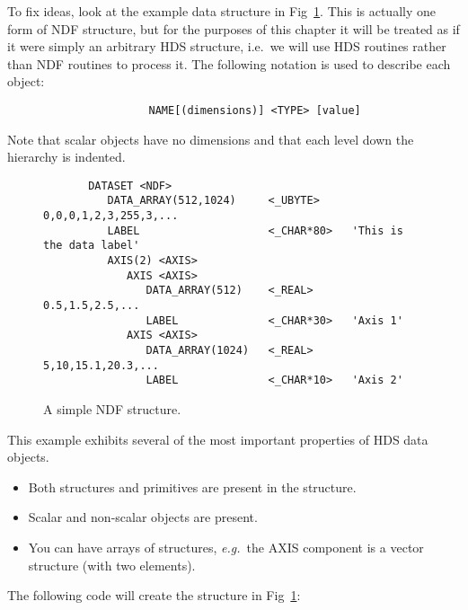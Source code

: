 To fix ideas, look at the example data structure in Fig~\ref{F_exndf}.
This is actually one form of NDF structure, but for the purposes of this chapter
it will be treated as if it were simply an arbitrary HDS structure, i.e.\ we
will use HDS routines rather than NDF routines to process it.
The following notation is used to describe each object:

\begin{small}
\begin{verbatim}
                      NAME[(dimensions)] <TYPE> [value]
\end{verbatim}
\end{small}


Note that scalar objects have no dimensions and that each level down the
hierarchy is indented.

\begin{figure}[htb]

\begin{small}
\begin{verbatim}
       DATASET <NDF>
          DATA_ARRAY(512,1024)     <_UBYTE>     0,0,0,1,2,3,255,3,...
          LABEL                    <_CHAR*80>   'This is the data label'
          AXIS(2) <AXIS>
             AXIS <AXIS>
                DATA_ARRAY(512)    <_REAL>      0.5,1.5,2.5,...
                LABEL              <_CHAR*30>   'Axis 1'
             AXIS <AXIS>
                DATA_ARRAY(1024)   <_REAL>      5,10,15.1,20.3,...
                LABEL              <_CHAR*10>   'Axis 2'
\end{verbatim}
\end{small}

\caption{A simple NDF structure.}
\label{F_exndf}
\end{figure}

This example exhibits several of the most important properties of HDS data
objects.

\begin{itemize}
\item Both structures and primitives are present in the structure.
\item Scalar and non-scalar objects are present.
\item You can have arrays of structures, {\em e.g.}\, the AXIS component is a
 vector structure (with two elements).
\end{itemize}

The following code will create the structure in Fig~\ref{F_exndf}:

